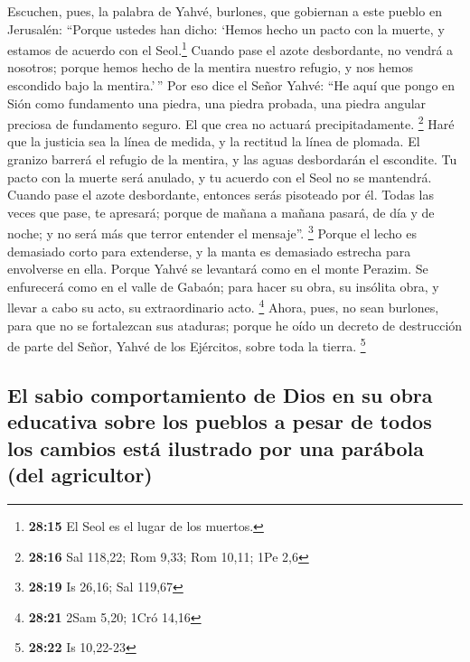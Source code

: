  Escuchen, pues, la palabra de Yahvé, burlones, que
gobiernan a este pueblo en Jerusalén:  ``Porque ustedes
han dicho: `Hemos hecho un pacto con la muerte, y estamos de acuerdo con
el Seol.\footnote{\textbf{28:15} El Seol es el lugar de los muertos.}
Cuando pase el azote desbordante, no vendrá a nosotros; porque hemos
hecho de la mentira nuestro refugio, y nos hemos escondido bajo la
mentira.'\,''  Por eso dice el Señor Yahvé: ``He aquí que
pongo en Sión como fundamento una piedra, una piedra probada, una piedra
angular preciosa de fundamento seguro. El que crea no actuará
precipitadamente. \footnote{\textbf{28:16} Sal 118,22; Rom 9,33; Rom
  10,11; 1Pe 2,6}  Haré que la justicia sea la línea de
medida, y la rectitud la línea de plomada. El granizo barrerá el refugio
de la mentira, y las aguas desbordarán el escondite.  Tu
pacto con la muerte será anulado, y tu acuerdo con el Seol no se
mantendrá. Cuando pase el azote desbordante, entonces serás pisoteado
por él.  Todas las veces que pase, te apresará; porque de
mañana a mañana pasará, de día y de noche; y no será más que terror
entender el mensaje''. \footnote{\textbf{28:19} Is 26,16; Sal 119,67}
 Porque el lecho es demasiado corto para extenderse, y la
manta es demasiado estrecha para envolverse en ella. 
Porque Yahvé se levantará como en el monte Perazim. Se enfurecerá como
en el valle de Gabaón; para hacer su obra, su insólita obra, y llevar a
cabo su acto, su extraordinario acto. \footnote{\textbf{28:21} 2Sam
  5,20; 1Cró 14,16}  Ahora, pues, no sean burlones, para
que no se fortalezcan sus ataduras; porque he oído un decreto de
destrucción de parte del Señor, Yahvé de los Ejércitos, sobre toda la
tierra. \footnote{\textbf{28:22} Is 10,22-23}

\hypertarget{el-sabio-comportamiento-de-dios-en-su-obra-educativa-sobre-los-pueblos-a-pesar-de-todos-los-cambios-estuxe1-ilustrado-por-una-paruxe1bola-del-agricultor}{%
\subsection{El sabio comportamiento de Dios en su obra educativa sobre
los pueblos a pesar de todos los cambios está ilustrado por una parábola
(del
agricultor)}\label{el-sabio-comportamiento-de-dios-en-su-obra-educativa-sobre-los-pueblos-a-pesar-de-todos-los-cambios-estuxe1-ilustrado-por-una-paruxe1bola-del-agricultor}}

